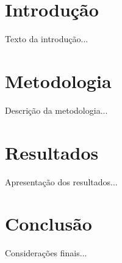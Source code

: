 \documentclass[12pt,openright,oneside,a4paper,english,brazil]{abntex2}
\begin{document}
\imprimircapa
\imprimirfolhaderosto

\tableofcontents*

\chapter{Introdução}
Texto da introdução...

\chapter{Metodologia}
Descrição da metodologia...

\chapter{Resultados}
Apresentação dos resultados...

\chapter{Conclusão}
Considerações finais...


\end{document}
